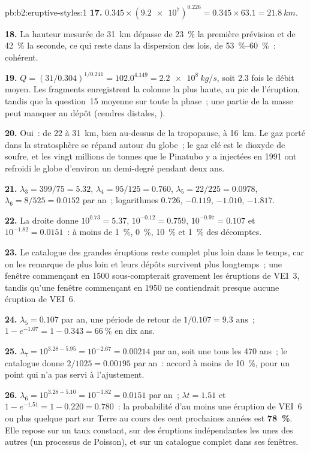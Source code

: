 \begin{solution}{pb:b2:eruptive-styles:1}
\textbf{17.} $0.345\times(\num{9.2e7})^{0.226} = 0.345\times63.1 = \qty{21.8}{km}$.

\textbf{18.} La hauteur mesurée de \qty{31}{km} dépasse de \qty{23}{\percent} la première
prévision et de \qty{42}{\percent} la seconde, ce qui reste dans la
dispersion des lois, de \qtyrange{53}{60}{\percent}~: cohérent.

\textbf{19.} $Q = (31/0.304)^{1/0.241} = 102.0^{4.149} = \qty{2.2e8}{kg/s}$, soit 2.3 fois
le débit moyen. Les fragments enregistrent la colonne la plus haute, au pic de
l'éruption, tandis que la question~15 moyenne sur toute la phase~; une partie de la masse
peut manquer au dépôt (cendres distales, ).

\textbf{20.} Oui~: de 22 à \qty{31}{km}, bien au-dessus de la tropopause, à \qty{16}{km}.
Le gaz porté dans la stratosphère se répand autour du globe~; le gaz clé est
le dioxyde de soufre, et les vingt millions de tonnes que le Pinatubo y a injectées en 1991
ont refroidi le globe d'environ un demi-degré pendant deux ans.

\textbf{21.} $\lambda_3 = 399/75 = 5.32$, $\lambda_4 = 95/125 = 0.760$, $\lambda_5 = 22/225 =
0.0978$, $\lambda_6 = 8/525 = 0.0152$ par an~; logarithmes $0.726$, $-0.119$, $-1.010$,
$-1.817$.

\textbf{22.} La droite donne $10^{0.73} = 5.37$, $10^{-0.12} = 0.759$, $10^{-0.97} =
0.107$ et $10^{-1.82} = 0.0151$~: à moins de \qty{1}{\percent}, \qty{0}{\percent},
\qty{10}{\percent} et \qty{1}{\percent} des décomptes.

\textbf{23.} Le catalogue des grandes éruptions reste complet plus loin dans le temps,
car on les remarque de plus loin et leurs dépôts survivent plus longtemps~; une fenêtre
commençant en 1500 sous-compterait gravement les éruptions de VEI~3, tandis qu'une fenêtre
commençant en 1950 ne contiendrait presque aucune éruption de VEI~6.

\textbf{24.} $\lambda_5 = \num{0.107}$ par an, une période de retour de $1/0.107 =
\num{9.3}\text{ ans}$~; $1 - e^{-1.07} = 1 - 0.343 = \qty{66}{\percent}$ en dix ans.

\textbf{25.} $\lambda_7 = 10^{3.28 - 5.95} = 10^{-2.67} = 0.00214$ par an, soit une tous les
470 ans~; le catalogue donne $2/1025 = 0.00195$ par an~: accord à moins de
\qty{10}{\percent}, pour un point qui n'a pas servi à l'ajustement.

\textbf{26.} $\lambda_6 = 10^{3.28 - 5.10} = 10^{-1.82} = 0.0151$ par an~; $\lambda t = 1.51$
et $1 - e^{-1.51} = 1 - 0.220 = 0.780$~: la probabilité d'au moins une éruption
de VEI~6 ou plus quelque part sur Terre au cours des cent prochaines années est
\textbf{\qty[text-series-to-math=true]{78}{\percent}}. Elle repose sur un taux constant,
sur des éruptions indépendantes les unes des autres (un processus de Poisson), et sur un
catalogue complet dans ses fenêtres.
\end{solution}
